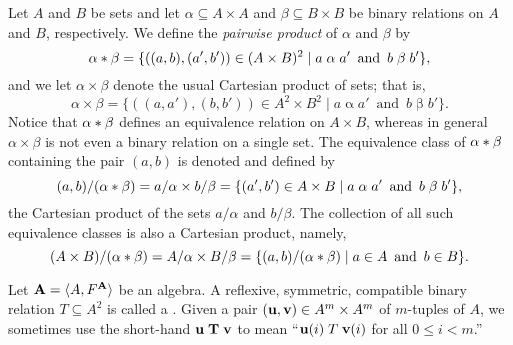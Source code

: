 Let $A$ and $B$ be sets and let $\alpha \subseteq A\times A$ and $\beta \subseteq B\times B$
be binary relations on $A$ and $B$, respectively.
We define
the \emph{pairwise product} of $\alpha$ and $\beta$ by
\begin{equation}
\label{eq:pair-product}
\alpha \ast \beta = \{((a, b), (a', b'))
\in (A\times B)^2 \mid a\mathrel{\alpha} a'\, \text{ and } \,  b\mathrel{\beta} b'\},
\end{equation}
and we let $\alpha \times \beta$ denote the usual Cartesian product of sets; that is,
\begin{equation}
\label{eq:set-product}
\alpha \times \beta = \{((a, a'), (b, b'))
\in A^2\times B^2 \mid a\mathrel{\alpha} a' \, \text{ and } \, b\mathrel{\beta} b'\}.
\end{equation}
Notice that $\alpha \ast \beta$ defines an equivalence relation on
$A\times B$, whereas in general $\alpha\times \beta$ is
not even a binary relation on a single set.
The equivalence class of $\alpha \ast \beta$ containing the pair
$(a, b)$ is denoted and defined by %
\[(a,b)/(\alpha \ast \beta) = a/\alpha \times b/\beta=
    \{(a', b') \in A\times B \mid a\mathrel{\alpha} a' \, \text{ and } \,  b\mathrel{\beta} b'\},
    \]
the Cartesian product of the sets $a/\alpha$ and $b/\beta$.
The collection of all such equivalence classes is also a Cartesian product, namely,
\[
(A\times B)/(\alpha \ast \beta) =
A/\alpha \times B/\beta  = \{(a, b)/(\alpha \ast \beta) \mid a\in A \, \text{ and } \, b \in B\}.\]




Let $\mathbf{A} = \langle A, F^{\mathbf{A}}\rangle$ be an algebra.
A reflexive, symmetric, compatible binary relation $T\subseteq A^2$ is called a
.
Given a pair $(\mathbf{u}, \mathbf{v}) \in A^m\times A^m$ of $m$-tuples of $A$, we sometimes
use the short-hand $\mathbf{u} \mathrel{\mathbf{T}} \mathbf{v}$ to mean
``$\mathbf{u}(i) \mathrel{T} \mathbf{v}(i)$ for all $0\leq i<m$.''

